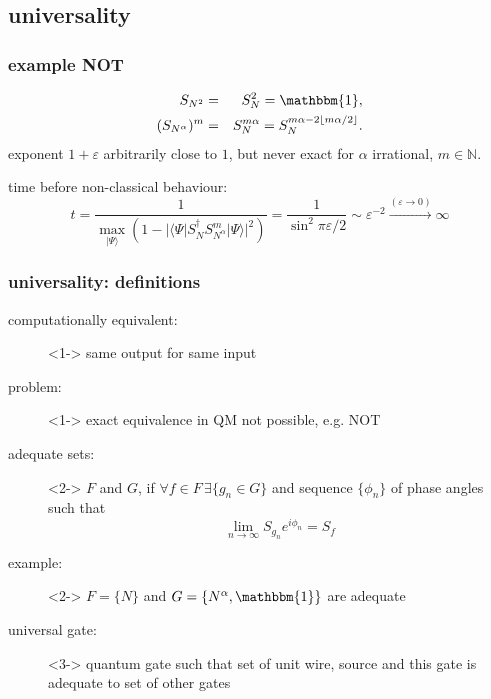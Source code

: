 \documentclass{beamer}
\begin{document}
\subsection{universality}
\begin{frame}
    \frametitle{example NOT}
    \begin{eqnarray}
        S_{N^2}&=&S_N^2=\mathbbm{1},\\
        (S_{N^\alpha})^m&=&S_N^{m\alpha}=S_N^{m\alpha-2\lfloor m\alpha/2\rfloor}.
	\end{eqnarray}
	exponent $1+\varepsilon$ arbitrarily close to $1$, but never exact for $\alpha$ irrational, $m\in\mathbb{N}$.
	\begin{block}{time before non-classical behaviour:}
		\begin{equation*}
			t=\frac{1}{\max_{|\Psi\rangle}(1-|\langle\Psi|S_N^\dagger S_{N^\alpha}^m|\Psi\rangle|^2)}= \frac{1}{\sin^2\pi\varepsilon/2}\sim\varepsilon^{-2}\stackrel{(\varepsilon\to0)}\to\infty
    	\end{equation*}
	\end{block}
\end{frame}
\begin{frame}
    \frametitle{universality: definitions}
    \begin{description}
    	\item[computationally equivalent:]<1-> same output for same input
		\item[problem:]<1-> exact equivalence in QM not possible, e.g. NOT
        \item[adequate sets:]<2-> $F$ and $G$, if $\forall f\in F\,\exists \{g_n\in
        G\}$ and sequence $\{\phi_n\}$ of phase angles such that
        \begin{equation}
			\lim_{n\to\infty} S_{g_n} e^{i\phi_n}=S_f
		\end{equation}
		\item[example:]<2-> $F=\{N\}$ and $G=\{N^\alpha,\mathbbm{1}\}$ are adequate
        \item[universal gate:]<3-> quantum gate such that set of unit wire, source and this gate is adequate to set of other gates
    \end{description}
\end{frame}
%
\end{document}
